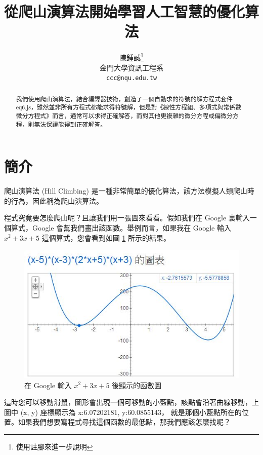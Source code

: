 \documentclass{article}
\title{從爬山演算法開始學習人工智慧的優化算法}
\author{
  陳鍾誠\thanks{使用註腳來進一步說明}\\
  金門大學資訊工程系\\
  \texttt{ccc@nqu.edu.tw} \\
}
\begin{document}
\maketitle

\begin{abstract}
我們使用爬山演算法，結合編譯器技術，創造了一個自動求的符號的解方程式套件 eq6.js，雖然並非所有方程式都能求得符號解，但是對《線性方程組、多項式與常係數微分方程式》而言，通常可以求得正確解答，而對其他更複雜的微分方程或偏微分方程，則無法保證能得到正確解答。
\end{abstract}




\section{簡介}

爬山演算法 (Hill Climbing) 是一種非常簡單的優化算法，該方法模擬人類爬山時的行為，因此稱為爬山演算法。

程式究竟要怎麼爬山呢？且讓我們用一張圖來看看。假如我們在 Google 裏輸入一個算式，Google 會幫我們畫出該函數。舉例而言，如果我在 Google 輸入 $x^2+3x+5$  這個算式，您會看到如圖 \ref{fig:curve1} 所示的結果。

\begin{figure}
  \includegraphics[width=\linewidth]{img/GoogleGraph2Dvally.jpg}
  \caption{在 Google 輸入 $x^2+3x+5$ 後顯示的函數圖}
  \label{fig:curve1}
\end{figure}


這時您可以移動滑鼠，圖形會出現一個可移動的小藍點，該點會沿著曲線移動，上圖中 (x, y) 座標顯示為 x:6.07202181, y:60.0855143，
就是那個小藍點所在的位置。如果我們想要寫程式尋找這個函數的最低點，那我們應該怎麼找呢？
\end{document}

